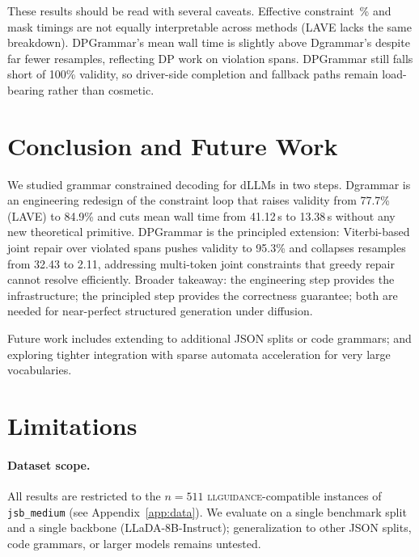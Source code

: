 These results should be read with several caveats. Effective constraint~\% and mask timings are not equally interpretable across methods (LAVE lacks the same breakdown). DPGrammar's mean wall time is slightly above Dgrammar's despite far fewer resamples, reflecting DP work on violation spans. DPGrammar still falls short of 100\% validity, so driver-side completion and fallback paths remain load-bearing rather than cosmetic.



\section{Conclusion and Future Work}

We studied grammar constrained decoding for dLLMs in two steps. Dgrammar is an engineering redesign of the constraint loop that raises validity from 77.7\% (LAVE) to 84.9\% and cuts mean wall time from 41.12\,s to 13.38\,s without any new theoretical primitive. DPGrammar is the principled extension: Viterbi-based joint repair over violated spans pushes validity to 95.3\% and collapses resamples from 32.43 to 2.11, addressing multi-token joint constraints that greedy repair cannot resolve efficiently. Broader takeaway: the engineering step provides the infrastructure; the principled step provides the correctness guarantee; both are needed for near-perfect structured generation under diffusion.

Future work includes extending to additional JSON splits or code grammars; and exploring tighter integration with sparse automata acceleration \citep{su2026vectorizingtrieefficientconstrained} for very large vocabularies.

\section{Limitations}

\paragraph{Dataset scope.}
All results are restricted to the $n{=}511$ \textsc{llguidance}-compatible instances of \texttt{jsb\_medium} (see Appendix~\ref{app:data}).
We evaluate on a single benchmark split and a single backbone (LLaDA-8B-Instruct); generalization to other JSON splits, code grammars, or larger models remains untested.


